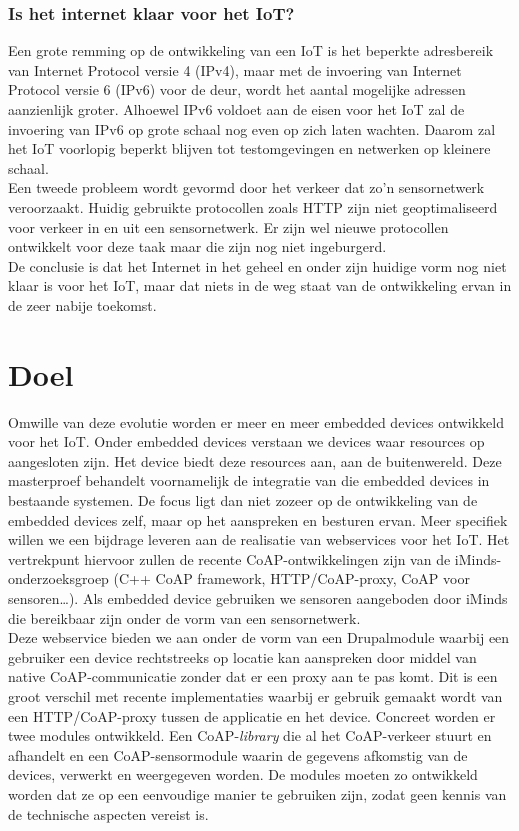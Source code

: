 \subsubsection{Is het internet klaar voor het IoT?}
Een grote remming op de ontwikkeling van een IoT is het beperkte adresbereik van Internet Protocol versie 4 (IPv4), maar met de invoering van Internet Protocol versie 6 (IPv6) voor de deur, wordt het aantal mogelijke adressen aanzienlijk groter.
Alhoewel IPv6 voldoet aan de eisen voor het IoT zal de invoering van IPv6 op grote schaal nog even op zich laten wachten. Daarom zal het IoT voorlopig beperkt blijven tot testomgevingen en netwerken op kleinere schaal.\\
Een tweede probleem wordt gevormd door het verkeer dat zo'n sensornetwerk veroorzaakt. Huidig gebruikte protocollen zoals HTTP zijn niet geoptimaliseerd voor verkeer in en uit een sensornetwerk. Er zijn wel nieuwe protocollen ontwikkelt voor deze taak maar die zijn nog niet ingeburgerd.\\
De conclusie is dat het Internet in het geheel en onder zijn huidige vorm nog niet klaar is voor het IoT, maar dat niets in de weg staat van de ontwikkeling ervan in de zeer nabije toekomst.

\section{Doel}

Omwille van deze evolutie worden er meer en meer embedded devices ontwikkeld voor het IoT. Onder embedded devices verstaan we devices waar resources op aangesloten zijn. Het device biedt deze resources aan, aan de buitenwereld. Deze masterproef behandelt voornamelijk de integratie van die embedded devices in bestaande systemen. De focus ligt dan niet zozeer op de ontwikkeling van de embedded devices zelf, maar op het aanspreken en besturen ervan. Meer specifiek willen we een bijdrage leveren aan de realisatie van webservices voor het IoT. Het vertrekpunt hiervoor zullen de recente CoAP-ontwikkelingen zijn van de iMinds-onderzoeksgroep (C++ CoAP framework, HTTP/CoAP-proxy, CoAP voor sensoren…). Als embedded device gebruiken we sensoren aangeboden door iMinds die bereikbaar zijn onder de vorm van een sensornetwerk.\\

Deze webservice bieden we aan onder de vorm van een Drupalmodule waarbij een gebruiker een device rechtstreeks op locatie kan aanspreken door middel van native CoAP-communicatie zonder dat er een proxy aan te pas komt. Dit is een groot verschil met recente implementaties waarbij er gebruik gemaakt wordt van een HTTP/CoAP-proxy tussen de applicatie en het device. Concreet worden er twee modules ontwikkeld. Een CoAP-\textit{library} die al het CoAP-verkeer stuurt en afhandelt en een CoAP-sensormodule waarin de gegevens afkomstig van de devices, verwerkt en weergegeven worden. De modules moeten zo ontwikkeld worden dat ze op een eenvoudige manier te gebruiken zijn, zodat geen kennis van de technische aspecten vereist is.

